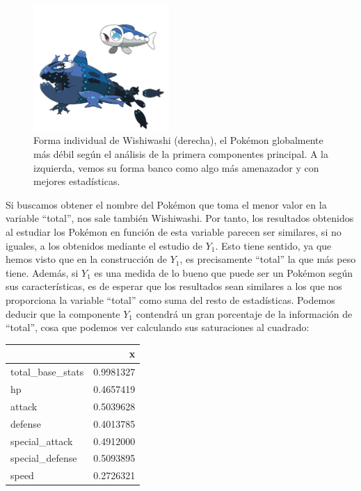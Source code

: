 \documentclass[
  11.8pt,
]{extreport}
\begin{document}
\begin{figure}[H]

{\centering \includegraphics[width=2.03125in,height=\textheight]{trabajo_images/wishiwashi.png}

}

\caption{Forma individual de Wishiwashi (derecha), el Pokémon
globalmente más débil según el análisis de la primera componentes
principal. A la izquierda, vemos su forma banco como algo más amenazador
y con mejores estadísticas.}

\end{figure}%

Si buscamos obtener el nombre del Pokémon que toma el menor valor en la
variable ``total'', nos sale también Wishiwashi. Por tanto, los
resultados obtenidos al estudiar los Pokémon en función de esta variable
parecen ser similares, si no iguales, a los obtenidos mediante el
estudio de \(Y_1\). Esto tiene sentido, ya que hemos visto que en la
construcción de \(Y_1\), es precisamente ``total'' la que más peso
tiene. Además, si \(Y_1\) es una medida de lo bueno que puede ser un
Pokémon según sus características, es de esperar que los resultados sean
similares a los que nos proporciona la variable ``total'' como suma del
resto de estadísticas. Podemos deducir que la componente \(Y_1\)
contendrá un gran porcentaje de la información de ``total'', cosa que
podemos ver calculando sus saturaciones al cuadrado:

\begin{table}[H]
\centering\begingroup\fontsize{10.5}{12.5}\selectfont

\begin{tabular}{lr}
\toprule
  & x\\
\midrule
total\_base\_stats & 0.9981327\\
hp & 0.4657419\\
attack & 0.5039628\\
defense & 0.4013785\\
special\_attack & 0.4912000\\
\addlinespace
special\_defense & 0.5093895\\
speed & 0.2726321\\
\bottomrule
\end{tabular}
\endgroup{}
\end{table}
\end{document}
